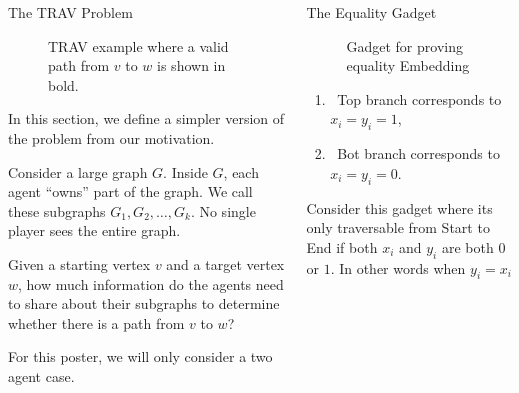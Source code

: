 \begin{columns}[T]
\begin{block}{The TRAV Problem}
\begin{figure}
\begin{tikzpicture}[scale=2.2]
\end{tikzpicture}

\caption{TRAV example where a valid path from $v$ to $w$ is shown in bold.}
\end{figure}


\vspace{0.3em}
In this section, we define a simpler version of the problem from our motivation.

Consider a large graph $G$. Inside $G$, each agent “owns” part of the graph. We call these subgraphs $G_1, G_2, \dots, G_k$. No single player sees the entire graph.

Given a starting vertex $v$ and a target vertex $w$, how much information do the agents need to share about their subgraphs to determine whether there is a path from $v$ to $w$?

For this poster, we will only consider a two agent case. 

\end{block}

\begin{block}{ The Equality Gadget}

\begin{figure}[H]
\label{fig:equality_gadget}
\caption{Gadget for proving equality Embedding}
\end{figure}

\begin{enumerate}
    \item \ Top branch corresponds to $x_i = y_i = 1$, 
    \item \ Bot branch corresponds to $x_i = y_i = 0$. 
\end{enumerate}

Consider this gadget where its only traversable from Start to End if both $x_i$ and $y_i$ are both $0$ or $1$. In other words when $y_i=x_i$

\end{block}

\end{columns}



